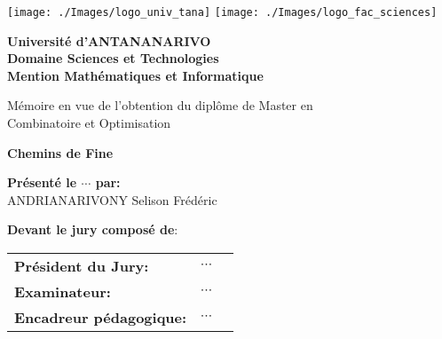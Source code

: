 \begin{titlepage}
\begin{center}
  \texttt{[image: ./Images/logo\_univ\_tana]}
  \hspace*{11cm}\texttt{[image: ./Images/logo\_fac\_sciences]}
  \vspace{1cm}\\
  
\end{center}

\begin{center}

 \textbf{Université d'ANTANANARIVO}\\
 \textbf{Domaine Sciences et Technologies}\\
 \textbf{Mention Mathématiques et Informatique}\\
 
 \vspace{40pt}

 Mémoire en vue de l’obtention du diplôme de Master en\\ 
 Combinatoire et Optimisation
 
 \vspace{40pt}
 \begin{Large}
 	\textbf{Chemins de Fine}	\\
 \end{Large}
 \vspace{40pt}
\textbf{Présenté le $\cdots$ par:}\\
ANDRIANARIVONY Selison Frédéric  \\
 
 \vspace{40pt}
 
 \textbf{Devant le jury composé de}:
\vspace{15pt}
\renewcommand\arraystretch{1}
\begin{table}[ht]
	\begin{tabularx}{1\textwidth}{ 
         >{\centering\arraybackslash}l 
         >{\centering\arraybackslash}l 
         >{\centering\arraybackslash}X }
        \textbf{Président du Jury:}    & $\cdots$ & \\ %
        \textbf{Examinateur:}    & $\cdots$ & \\ %
        \textbf{Encadreur pédagogique:} & $\cdots$ & \\ %
        \end{tabularx}
\end{table} 

\end{center}
\end{titlepage}
\restoregeometry  
